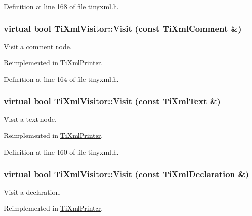 Definition at line 168 of file tinyxml.h.\hypertarget{class_ti_xml_visitor_a53a60e7a528627b31af3161972cc7fa2}{
\subsubsection[{Visit}]{\setlength{\rightskip}{0pt plus 5cm}virtual bool TiXmlVisitor::Visit (const {\bf TiXmlComment} \&)}}
\label{class_ti_xml_visitor_a53a60e7a528627b31af3161972cc7fa2}


Visit a comment node. 

Reimplemented in \hyperlink{class_ti_xml_printer_a9870423f5603630e6142f6bdb66dfb57}{TiXmlPrinter}.

Definition at line 164 of file tinyxml.h.\hypertarget{class_ti_xml_visitor_a399b8ebca5cd14664974a32d2ce029e5}{
\subsubsection[{Visit}]{\setlength{\rightskip}{0pt plus 5cm}virtual bool TiXmlVisitor::Visit (const {\bf TiXmlText} \&)}}
\label{class_ti_xml_visitor_a399b8ebca5cd14664974a32d2ce029e5}


Visit a text node. 

Reimplemented in \hyperlink{class_ti_xml_printer_a0857c5d32c59b9a257f9a49cb9411df5}{TiXmlPrinter}.

Definition at line 160 of file tinyxml.h.\hypertarget{class_ti_xml_visitor_afad71c71ce6473fb9b4b64cd92de4a19}{
\subsubsection[{Visit}]{\setlength{\rightskip}{0pt plus 5cm}virtual bool TiXmlVisitor::Visit (const {\bf TiXmlDeclaration} \&)}}
\label{class_ti_xml_visitor_afad71c71ce6473fb9b4b64cd92de4a19}


Visit a declaration. 

Reimplemented in \hyperlink{class_ti_xml_printer_adaf7eec4dc43ad071ff52b60361574f5}{TiXmlPrinter}.

